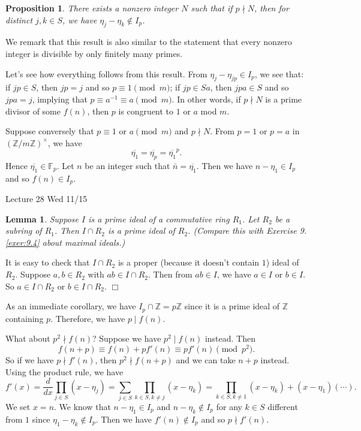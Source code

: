 \documentclass{article}
\def\Z{{\mathbb Z}}
\def\F{{\mathbb F}}
\def\Z{{\mathbb Z}}
\def\F{{\mathbb F}}
\def\v{{\vspace{5pt}}}
\newtheorem{lemma}[subsection]{Lemma}
\newtheorem{proposition}[subsection]{Proposition}
\newenvironment{proof}{\noindent {\bf Proof:}}{$\Box$ \vspace{2 ex}}
\newcommand{\add}[1]{{\color{blue} #1}}
\begin{document}
\begin{proposition}\label{prop:N}
    There exists a nonzero integer $N$ such that if $p\nmid N$, then for distinct $j,k\in S$, we have $\eta_j - \eta_k\notin I_p$.
\end{proposition}

We remark that this result is also similar to the statement that every nonzero integer is divisible by only finitely many primes.

\v
Let's see how everything follows from this result. From $\eta_j - \eta_{jp}\in I_p$, we see that: if $jp\in S$, then $jp = j$ and so $p\equiv 1\pmod{m}$; if $jp \in Sa$, then $jpa\in S$ and so $jpa = j$, implying that $p\equiv a^{-1}\equiv a\pmod{m}$. In other words, if $p\nmid N$ is a prime divisor of some $f(n)$, then $p$ is congruent to $1$ or $a$ mod $m$.


\vspace{5pt}
Suppose conversely that $p\equiv 1\mbox{ or }a\pmod{m}$ and $p\nmid N$. From $p = 1$ or $p=a$ in $(\Z/m\Z)^\times$, we have $$\overline{\eta_1} = \overline{\eta_{p}} = \overline{\eta_1}^p.$$ 
Hence $\overline{\eta_1}\in\F_p$. Let $n$ be an integer such that $\bar{n} = \overline{\eta_1}$. Then we have $n - \eta_1\in I_p$ and so $f(n) \in I_p$.

\begin{center}
    \add{Lecture 28 Wed 11/15}
\end{center}

\begin{lemma}
    Suppose $I$ is a prime ideal of a commutative ring $R_1$. Let $R_2$ be a subring of $R_1$. Then $I\cap R_2$ is a prime ideal of $R_2$. (Compare this with Exercise 9.\ref{exer:9.4} about maximal ideals.)
\end{lemma}

\begin{proof}
    It is easy to check that $I\cap R_2$ is a proper (because it doesn't contain $1$) ideal of $R_2$. Suppose $a,b\in R_2$ with $ab\in I\cap R_2$. Then from $ab\in I$, we have $a\in I$ or $b\in I$. So $a\in I\cap R_2$ or $b\in I\cap R_2$.
\end{proof}

As an immediate corollary, we have $I_p\cap \Z = p\Z$ since it is a prime ideal of $\Z$ containing $p$. Therefore, we have $p\mid f(n)$. 



What about $p^2\nmid f(n)$? Suppose we have $p^2\mid f(n)$ instead. Then
$$f(n + p) \equiv f(n) + pf'(n) \equiv pf'(n)\pmod{p^2}.$$
So if we have $p\nmid f'(n)$, then $p^2\nmid f(n+p)$ and we can take $n+p$ instead. Using the product rule, we have
$$f'(x) = \frac{d}{dx}\prod_{j\in S}(x - \eta_j) = \sum_{j\in S}\prod_{k\in S, k\neq j}(x - \eta_k) = \prod_{k\in S,k\neq 1}(x - \eta_k) + (x - \eta_1)(\cdots).$$
We set $x = n$. We know that $n - \eta_1\in I_p$ and $n - \eta_k\notin I_p$ for any $k\in S$ different from $1$ since $\eta_1 - \eta_k\notin I_p$. Then we have $f'(n) \notin I_p$ and so $p\nmid f'(n)$.
\end{document}

